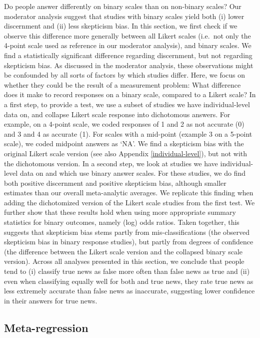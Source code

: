\documentclass[
  doc,floatsintext]{apa6}
\begin{document}
Do people answer differently on binary scales than on non-binary scales? Our moderator analysis suggest that studies with binary scales yield both (i) lower discernment and (ii) less skepticism bias. In this section, we first check if we observe this difference more generally between all Likert scales (i.e.~not only the 4-point scale used as reference in our moderator analysis), and binary scales. We find a statistically significant difference regarding discernment, but not regarding skepticism bias. As discussed in the moderator analysis, these observations might be confounded by all sorts of factors by which studies differ. Here, we focus on whether they could be the result of a measurement problem: What difference does it make to record responses on a binary scale, compared to a Likert scale? In a first step, to provide a test, we use a subset of studies we have individual-level data on, and collapse Likert scale response into dichotomous answers. For example, on a 4-point scale, we coded responses of 1 and 2 as not accurate (0) and 3 and 4 as accurate (1). For scales with a mid-point (example 3 on a 5-point scale), we coded midpoint answers as `NA'. We find a skepticism bias with the original Likert scale version (see also Appendix \ref{individual-level}), but not with the dichotomous version. In a second step, we look at studies we have individual-level data on and which use binary answer scales. For these studies, we do find both positive discernment and positive skepticism bias, although smaller estimates than our overall meta-analytic averages. We replicate this finding when adding the dichotomized version of the Likert scale studies from the first test. We further show that these results hold when using more appropriate summary statistics for binary outcomes, namely (log) odds ratios. Taken together, this suggests that skepticism bias stems partly from mis-classifications (the observed skepticism bias in binary response studies), but partly from degrees of confidence (the difference between the Likert scale version and the collapsed binary scale version). Across all analyses presented in this section, we conclude that people tend to (i) classify true news as false more often than false news as true and (ii) even when classifying equally well for both and true news, they rate true news as less extremely accurate than false news as inaccurate, suggesting lower confidence in their answers for true news.

\subsection{Meta-regression}\label{meta-regression}
\end{document}
